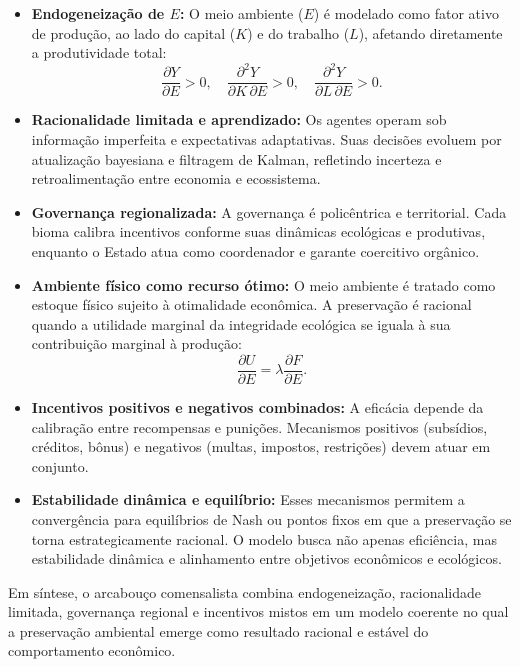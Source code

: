 \documentclass[a4paper,12pt,oneside,brazil,english]{abntex2}
\begin{document}
\begin{itemize}
    \item \textbf{Endogeneização de $E$:} 
    O meio ambiente ($E$) é modelado como fator ativo de produção, ao lado do capital ($K$) e do trabalho ($L$), afetando diretamente a produtividade total:
    \[
    \frac{\partial Y}{\partial E}>0,\quad 
    \frac{\partial^2 Y}{\partial K\,\partial E}>0,\quad 
    \frac{\partial^2 Y}{\partial L\,\partial E}>0.
    \]

    \item \textbf{Racionalidade limitada e aprendizado:} 
    Os agentes operam sob informação imperfeita e expectativas adaptativas. Suas decisões evoluem por atualização bayesiana e filtragem de Kalman, refletindo incerteza e retroalimentação entre economia e ecossistema.

    \item \textbf{Governança regionalizada:} 
    A governança é policêntrica e territorial. Cada bioma calibra incentivos conforme suas dinâmicas ecológicas e produtivas, enquanto o Estado atua como coordenador e garante coercitivo orgânico.

    \item \textbf{Ambiente físico como recurso ótimo:} 
    O meio ambiente é tratado como estoque físico sujeito à otimalidade econômica. A preservação é racional quando a utilidade marginal da integridade ecológica se iguala à sua contribuição marginal à produção:
    \[
    \frac{\partial U}{\partial E} = \lambda \frac{\partial F}{\partial E}.
    \]

    \item \textbf{Incentivos positivos e negativos combinados:} 
    A eficácia depende da calibração entre recompensas e punições. Mecanismos positivos (subsídios, créditos, bônus) e negativos (multas, impostos, restrições) devem atuar em conjunto.

    \item \textbf{Estabilidade dinâmica e equilíbrio:} 
    Esses mecanismos permitem a convergência para equilíbrios de Nash ou pontos fixos em que a preservação se torna estrategicamente racional. O modelo busca não apenas eficiência, mas estabilidade dinâmica e alinhamento entre objetivos econômicos e ecológicos.
\end{itemize}

\noindent
Em síntese, o arcabouço comensalista combina endogeneização, racionalidade limitada, governança regional e incentivos mistos em um modelo coerente no qual a preservação ambiental emerge como resultado racional e estável do comportamento econômico.
\end{document}
